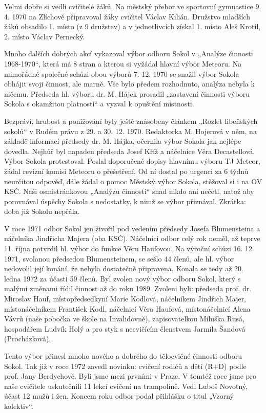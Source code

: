 Velmi dobře si vedli cvičitelé žáků. Na městský přebor ve sportovní
gymnastice 9. 4. 1970 na Zlíchově připravoval žáky cvičitel Václav
Kilián. Družstvo mladších žáků obsadilo 1. místo (z 9 družstev) a v
jednotlivcích získal 1. místo Aleš Krotil, 2. místo Václav Pernecký.

Mnoho dalších dobrých akcí vykazoval výbor odboru Sokol v „Analýze
činnosti 1968-1970``, která má 8 stran a kterou si vyžádal hlavní výbor
Meteoru. Na mimořádné společné schůzi obou výborů 7. 12. 1970 se snažil
výbor Sokola obhájit svoji činnost, ale marně. Vše bylo předem
rozhodnuto, analýza nebyla k ničemu. Předseda hl. výboru dr. M. Hájek
prosadil „zastavení činnosti výboru Sokola s okamžitou platností`` a
vyzval k opuštění místnosti.

Bezpráví, hrubost a ponižování byly ještě znásobeny článkem „Rozlet
libeňských sokolů`` v Rudém právu z 29. a 30. 12. 1970. Redaktorka M.
Hojerová v něm, na základě informací předsedy dr. M. Hájka, očernila
výbor Sokola jak nejlépe dovedla. Nejhůř byl napaden předseda Josef Kříž
a náčelnice Věra Decastellová. Výbor Sokola protestoval. Poslal
doporučené dopisy hlavnímu výboru TJ Meteor, žádal revizní komisi
Meteoru o přešetření. Od ní dostal po urgenci za 6 týdnů neurčitou
odpověď, dále žádal o pomoc Městský výbor Sokola, stěžoval si i na OV
KSČ. Naši osmistránkovou „Analýzu činnosti`` snad nikdo ani nečetl,
natož aby porovnával úspěchy Sokola s nedostatky, k nimž se výbor
přiznával. Zkrátka: doba již Sokolu nepřála.

V roce 1971 odbor Sokol jen živořil pod vedením předsedy Josefa
Blumensteina a náčelníka Jindřicha Majera (oba KSČ). Náčelnici odbor
celý rok neměl, až teprve 11. října potvrdil hl. výbor do funkce Věru
Haufovou. Na výroční schůzi 16. 12. 1971, svolanou předsedou
Blumensteinem, se sešlo 44 členů, ale hl. výbor nedovolil její konání,
že nebyla dostatečně připravena. Konala se tedy až 20. ledna 1972 za
účasti 59 členů. Byl zvolen nový výbor odboru Sokol, který s malými
změnami řídil činnost až do roku 1989. Zvoleni byli: předseda prof. dr.
Miroslav Hauf, místopředsedkyní Marie Kodlová, náčelníkem Jindřich
Majer, místonáčelníkem František Kodl, náčelnicí Věra Haufová,
místonáčelnicí Alena Vávrů (naše pobočka ve škole na Invalidovně),
zapisovatelkou Miluška Rusá, hospodářem Ludvík Holý a pro styk s
necvičícím členstvem Jarmila Šandová (Procházková).

Tento výbor přinesl mnoho nového a dobrého do tělocvičné činnosti odboru
Sokol. Tak již v roce 1972 zavedl novinku: cvičení rodičů a dětí (R+D)
podle prof. Jany Berdychové. Byli jsme mezi prvními v Praze. V tomtéž
roce jsme pro naše cvičitele uskutečnili 11 lekcí cvičení na trampolíně.
Vedl Luboš Novotný, účast 12 mužů i žen. Koncem roku odbor podal
přihlášku o titul „Vzorný kolektiv``.

